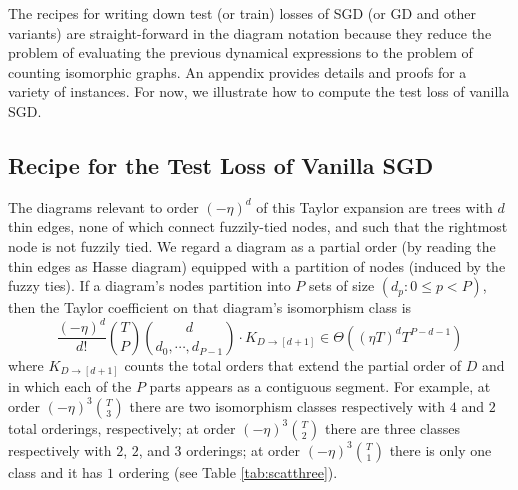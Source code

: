 \documentclass{article}
\begin{document}
    The recipes for writing down test (or train) losses of SGD (or GD and other
    variants) are straight-forward in the diagram notation because they reduce
    the problem of evaluating the previous dynamical expressions to the problem
    of counting isomorphic graphs.  An appendix provides details and proofs for
    a variety of instances.  For now, we illustrate how to compute the test
    loss of vanilla SGD.

\subsection*{Recipe for the Test Loss of Vanilla SGD}
    The diagrams relevant to order $(-\eta)^d$ of this Taylor expansion are
    trees with $d$ thin edges, none of which connect fuzzily-tied nodes, and
    such that the rightmost node is not fuzzily tied.  We regard a diagram as a
    partial order (by reading the thin edges as Hasse diagram) equipped with a
    partition of nodes (induced by the fuzzy ties).  If a diagram's nodes
    partition into $P$ sets of size $(d_p: 0\leq p < P)$, then the Taylor
    coefficient on that diagram's isomorphism class is
    $$
        \frac{(-\eta)^d}{d!} {T \choose P} {d \choose d_0, \cdots, d_{P-1}}
        \cdot 
        K_{D \to [d+1]}
        \in
        \Theta\left((\eta T)^d T^{P-d-1}\right)
    $$
    where $K_{D \to [d+1]}$ counts the total orders that extend the partial
    order of $D$ and in which each of the $P$ parts appears as a contiguous
    segment.  For example, at order $(-\eta)^3 {T \choose 3}$ there are two
    isomorphism classes respectively with $4$ and $2$ total orderings,
    respectively; at order $(-\eta)^3 {T \choose 2}$ there are three classes
    respectively with $2$, $2$, and $3$ orderings; at order $(-\eta)^3 {T
    \choose 1}$ there is only one class and it has $1$ ordering (see Table
    \ref{tab:scatthree}).
\end{document}
